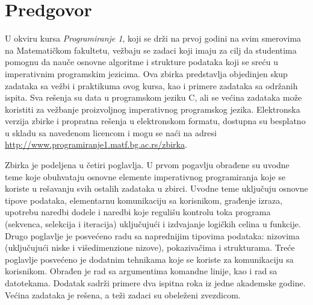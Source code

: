 \chapter*{Predgovor}

U okviru kursa {\em Programiranje 1}, koji se drži na prvoj godini na svim smerovima na Matematičkom fakultetu, vežbaju se zadaci koji imaju za cilj da studentima pomognu da nauče osnovne algoritme i strukture podataka koji se sreću u imperativnim programskim jezicima. Ova zbirka predstavlja objedinjen skup zadataka sa vežbi i praktikuma ovog kursa, kao i primere zadataka sa održanih ispita. Sva rešenja su data u programskom jeziku C, ali se većina zadataka može koristiti za vežbanje proizvoljnog imperativnog programskog jezika.
Elektronska verzija zbirke i propratna rešenja u elektronskom formatu, dostupna su besplatno u skladu sa navedenom licencom i mogu se naći na adresi \url{http://www.programiranje1.matf.bg.ac.rs/zbirka}.

Zbirka je podeljena u četiri poglavlja. U prvom pogavlju obrađene su uvodne teme koje obuhvataju osnovne elemente imperativnog programiranja koje se koriste u rešavanju svih ostalih zadataka u zbirci. Uvodne teme uključuju osnovne tipove podataka, elementarnu komunikaciju sa korisnikom, građenje izraza, upotrebu naredbi dodele i naredbi koje regulišu kontrolu toka programa (sekvenca, selekcija i iteracija) uključujući i izdvajanje logičkih celina u funkcije. Drugo poglavlje je posvećeno radu sa naprednijim tipovima podataka: nizovima (uključujući niske i višedimenzione nizove), pokazivačima i strukturama. Treće poglavlje posvećeno je dodatnim tehnikama koje se koriste za komunikaciju sa korisnikom. Obrađen je rad sa argumentima komandne linije, kao i rad sa datotekama. Dodatak sadrži primere dva ispitna roka iz jedne akademske godine. Većina zadataka je rešena, a teži zadaci su obeleženi zvezdicom.

